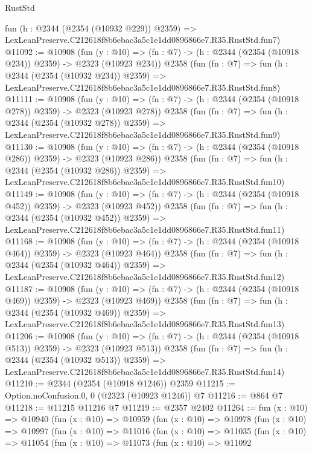 \begin{lexlean}{RustStd}
\begin{coremodule}
    fun (h : @2344 (@2354 (@10932 @229)) @2359) =>
    LexLeanPreserve.C212618f8b6ebac3a5c1e1dd0896866e7.R35.RustStd.fun7)
@11092 := @10908
    (fun (y : @10) => (fn : @7) -> (h : @2344 (@2354 (@10918 @234)) @2359) -> @2323 (@10923 @234))
    @2358
    (fun (fn : @7) =>
    fun (h : @2344 (@2354 (@10932 @234)) @2359) =>
    LexLeanPreserve.C212618f8b6ebac3a5c1e1dd0896866e7.R35.RustStd.fun8)
@11111 := @10908
    (fun (y : @10) => (fn : @7) -> (h : @2344 (@2354 (@10918 @278)) @2359) -> @2323 (@10923 @278))
    @2358
    (fun (fn : @7) =>
    fun (h : @2344 (@2354 (@10932 @278)) @2359) =>
    LexLeanPreserve.C212618f8b6ebac3a5c1e1dd0896866e7.R35.RustStd.fun9)
@11130 := @10908
    (fun (y : @10) => (fn : @7) -> (h : @2344 (@2354 (@10918 @286)) @2359) -> @2323 (@10923 @286))
    @2358
    (fun (fn : @7) =>
    fun (h : @2344 (@2354 (@10932 @286)) @2359) =>
    LexLeanPreserve.C212618f8b6ebac3a5c1e1dd0896866e7.R35.RustStd.fun10)
@11149 := @10908
    (fun (y : @10) => (fn : @7) -> (h : @2344 (@2354 (@10918 @452)) @2359) -> @2323 (@10923 @452))
    @2358
    (fun (fn : @7) =>
    fun (h : @2344 (@2354 (@10932 @452)) @2359) =>
    LexLeanPreserve.C212618f8b6ebac3a5c1e1dd0896866e7.R35.RustStd.fun11)
@11168 := @10908
    (fun (y : @10) => (fn : @7) -> (h : @2344 (@2354 (@10918 @464)) @2359) -> @2323 (@10923 @464))
    @2358
    (fun (fn : @7) =>
    fun (h : @2344 (@2354 (@10932 @464)) @2359) =>
    LexLeanPreserve.C212618f8b6ebac3a5c1e1dd0896866e7.R35.RustStd.fun12)
@11187 := @10908
    (fun (y : @10) => (fn : @7) -> (h : @2344 (@2354 (@10918 @469)) @2359) -> @2323 (@10923 @469))
    @2358
    (fun (fn : @7) =>
    fun (h : @2344 (@2354 (@10932 @469)) @2359) =>
    LexLeanPreserve.C212618f8b6ebac3a5c1e1dd0896866e7.R35.RustStd.fun13)
@11206 := @10908
    (fun (y : @10) => (fn : @7) -> (h : @2344 (@2354 (@10918 @513)) @2359) -> @2323 (@10923 @513))
    @2358
    (fun (fn : @7) =>
    fun (h : @2344 (@2354 (@10932 @513)) @2359) =>
    LexLeanPreserve.C212618f8b6ebac3a5c1e1dd0896866e7.R35.RustStd.fun14)
@11210 := @2344 (@2354 (@10918 @1246)) @2359
@11215 := Option.noConfusion.{0, 0} (@2323 (@10923 @1246)) @7
@11216 := @864 @7
@11218 := @11215 @11216 @7
@11219 := @2357 @2402
@11264 := fun (x : @10) =>
  @10940
    (fun (x : @10) =>
    @10959
      (fun (x : @10) =>
      @10978
        (fun (x : @10) =>
        @10997
          (fun (x : @10) =>
          @11016
            (fun (x : @10) =>
            @11035
              (fun (x : @10) =>
              @11054
                (fun (x : @10) =>
                @11073
                  (fun (x : @10) =>
                  @11092

\end{coremodule}
\end{lexlean}
